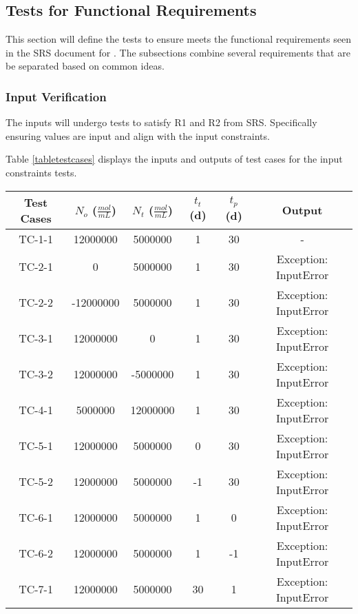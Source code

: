 \documentclass[12pt, titlepage]{article}
\begin{document}
\subsection{Tests for Functional Requirements} \label{tfr}

This section will define the tests to ensure \progname{} meets the functional 
requirements seen in the SRS document for \progname{} \citep{SRS}. The 
subsections combine 
several requirements that are be separated based on common ideas. 


\subsubsection{Input Verification}

The inputs will undergo tests to satisfy R1 and R2 from \progname{} SRS. 
Specifically ensuring values are input and align with the input constraints. 

Table \ref{tabletestcases} displays the inputs and outputs of test cases for the 
input constraints tests.

\begin{center}
 \begin{tabular}{|| c||c c c c|| c ||} 
 \hline
 \textbf{Test Cases} & \textbf{$N_{o}$ ($\frac{mol}{mL}$)} & \textbf{$N_{t}$ ($\frac{mol}{mL}$)} & \textbf{$t_{t}$ (d)} & \textbf{$t_{p}$ (d)} & \textbf{Output}\\ [0.5ex] 
 \hline
 TC-1-1 & 12000000 & 5000000 & 1 & 30 & - \\ 
 \hline
 TC-2-1 & 0 & 5000000 & 1 & 30 & Exception: InputError\\
 \hline
 TC-2-2 & -12000000 & 5000000 & 1 & 30 & Exception: InputError\\
 \hline
 TC-3-1 & 12000000 & 0 & 1 & 30 & Exception: InputError\\
 \hline
 TC-3-2 & 12000000 & -5000000 & 1 & 30 & Exception: InputError\\ 
 \hline
 TC-4-1 & 5000000 & 12000000 & 1 & 30 & Exception: InputError\\ 
 \hline
 TC-5-1 & 12000000 & 5000000 & 0 & 30 & Exception: InputError\\
 \hline
 TC-5-2 & 12000000 & 5000000 & -1 & 30 & Exception: InputError\\
 \hline
 TC-6-1 & 12000000 & 5000000 & 1 & 0 & Exception: InputError\\
 \hline
 TC-6-2 & 12000000 & 5000000 & 1 & -1 & Exception: InputError\\ 
 \hline
 TC-7-1 & 12000000 & 5000000 & 30 & 1 & Exception: InputError\\  [1ex] 
 \hline
\end{tabular}
\label{tabletestcases}

\end{center}		
\end{document}
